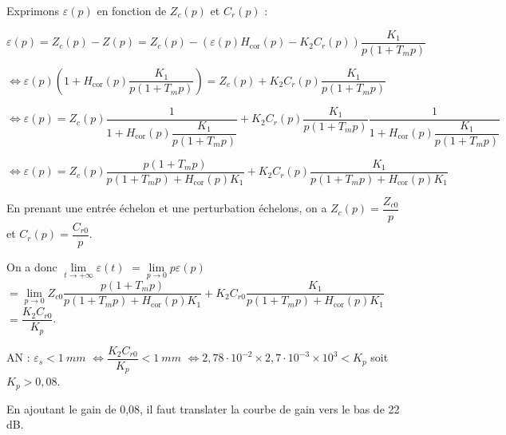 \ifprof
Exprimons $\varepsilon(p)$ en fonction de $Z_c(p)$ et $C_{r}(p)$ :

$
\varepsilon(p)=Z_c(p)-Z(p) = Z_c(p)- \left(\varepsilon(p) H_{\text{cor}}(p)-   K_2 C_r(p)\right) \dfrac{K_1}{p\left(1+T_m p\right)}$

$\Leftrightarrow \varepsilon(p)\left(1 +  H_{\text{cor}}(p)\dfrac{K_1}{p\left(1+T_m p\right)} \right) 
= Z_c(p) + K_2 C_r(p) \dfrac{K_1}{p\left(1+T_m p\right)}$

$\Leftrightarrow \varepsilon(p)  = 
Z_c(p)\dfrac{1}{1 +  H_{\text{cor}}(p)\dfrac{K_1}{p\left(1+T_m p\right)}} 
+   K_2 C_r(p) \dfrac{K_1}{p\left(1+T_m p\right)} \dfrac{1}{1 +  H_{\text{cor}}(p)\dfrac{K_1}{p\left(1+T_m p\right)}}$

$\Leftrightarrow \varepsilon(p)  = 
Z_c(p)\dfrac{{p\left(1+T_m p\right)}}{{p\left(1+T_m p\right)} +  H_{\text{cor}}(p){K_1}} 
+  K_2 C_r(p)  \dfrac{K_1}{p\left(1+T_m p\right) +  H_{\text{cor}}(p){K_1}}$


En prenant une entrée échelon et une perturbation échelons, on a $Z_c(p) = \dfrac{Z_{c0}}{p}$ et 
$C_{r}(p) = \dfrac{C_{r0}}{p}$.

On a donc $\lim\limits_{t\to +\infty} \varepsilon(t) $
$=\lim\limits_{p\to 0} p\varepsilon(p)$
$=  \lim\limits_{p\to 0} Z_{c0}\dfrac{{p\left(1+T_m p\right)}}{{p\left(1+T_m p\right)} +  H_{\text{cor}}(p){K_1}} 
+   K_2 C_{r0}  \dfrac{K_1}{p\left(1+T_m p\right) +  H_{\text{cor}}(p){K_1}} $ 
$ =   \dfrac{K_2 C_{r0}}{ K_p}$.

AN : $\varepsilon_s < \SI{1}{mm}$
$\Leftrightarrow \dfrac{K_2 C_{r0}}{ K_p} < \SI{1}{mm}$  
$\Leftrightarrow 
2,78 \cdot 10^{-2} \times 2,7 \cdot 10^{-3} \times 10^3<  K_p$  soit $K_p >0,08$.
\else
\fi


\ifprof
En ajoutant le gain de 0,08, il faut translater la courbe de gain vers le bas de 22 dB.

